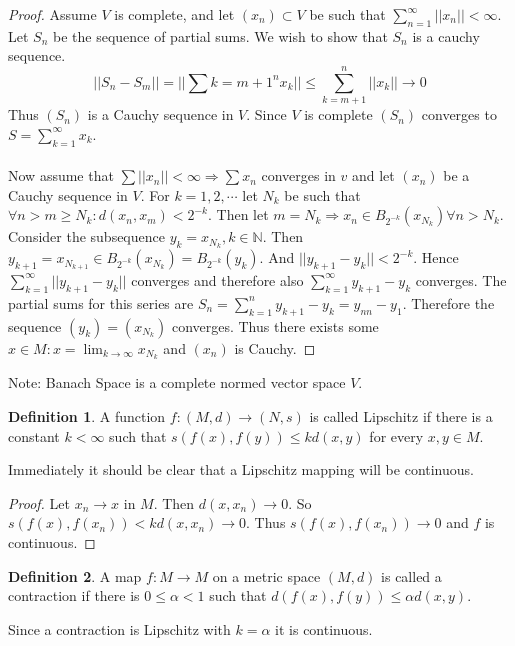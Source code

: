 \documentclass{article}
\theoremstyle{definition}
\newtheorem{definition}{Definition}[section]
\begin{document}
    \begin{proof}
        \fbox{$\Rightarrow$} Assume $V$ is complete, and let $(x_n) \subset V$ be such that $\sum_{n=1}^\infty ||x_n|| < \infty$.
        Let $S_n$ be the sequence of partial sums. We wish to show that $S_n$ is a cauchy sequence.
        \[
            ||S_n-S_m|| = ||\sum{k = m+1}^n x_k|| \leq \sum_{k = m + 1}^n || x_k|| \rightarrow 0
        \]
        Thus $(S_n)$ is a Cauchy sequence in $V$. Since $V$ is complete $(S_n)$ converges to $S = \sum_{k=1}^\infty x_k$.\\\\
        \fbox{$\Leftarrow$} Now assume that  $\sum ||x_n|| < \infty \Rightarrow \sum x_n$ converges in $v$ and let 
        $(x_n)$ be a Cauchy sequence in $V$. For $k = 1,2, \cdots $ let $N_k$ be such that $\forall n > m \geq N_k : d(x_n, x_m) < 2^{-k}$.
        Then let $m = N_k \Rightarrow x_n \in B_{2^{-k}}(x_{N_k}) \forall n > N_k$.
        Consider the subsequence $y_k = x_{N_k}, k \in \mathbb{N}$.
        Then $y_{k+1} = x_{N_{k+1}} \in B_{2^{-k}}(x_{N_k}) = B_{2^{-k}}(y_k)$. And $||y_{k+1} - y_k|| < 2^{-k}$.
        Hence $\sum_{k=1}^\infty ||y_{k+1} - y_k||$ converges and therefore also $\sum_{k=1}^\infty y_{k+1} - y_k$ converges.
        The partial sums for this series are $S_n = \sum_{k=1}^n y_{k+1} - y_k = y_{nn} - y_1$. Therefore the sequence 
        $(y_k) = (x_{N_k})$ converges. Thus there exists some $x \in M : x = \lim_{k\rightarrow \infty}x_{N_k}$ and $(x_n)$ is Cauchy.
    \end{proof}
    Note: Banach Space is a complete normed vector space $V$.

    \begin{definition}
        A function $f:(M,d) \rightarrow (N,s)$ is called Lipschitz if there is a constant $k < \infty$ such that
        $s(f(x), f(y)) \leq k d(x,y)$ for every $x,y \in M$.
    \end{definition}

    Immediately it should be clear that a Lipschitz mapping will be continuous.
    \begin{proof}
        Let $x_n \rightarrow x$ in $M$. Then $d(x, x_n) \rightarrow 0$. So $s(f(x), f(x_n)) < k d(x, x_n) \rightarrow 0$.
        Thus $s(f(x), f(x_n)) \rightarrow 0$ and $f$ is continuous.
    \end{proof}

    \begin{definition}
        A map $f: M \rightarrow M$ on a metric space $(M,d)$ is called a contraction if there is $0 \leq \alpha <1$ such that 
        $d(f(x), f(y)) \leq \alpha d(x,y)$.
    \end{definition}
    Since a contraction is Lipschitz with $k = \alpha$ it is continuous.
\end{document}
